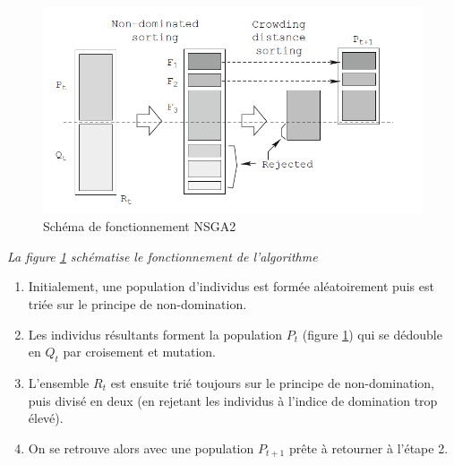 \documentclass[12pt]{report}
\begin{document}
      \begin{figure}[h]
        \centering
        \includegraphics[width=12cm]{img/sch_nsga2.png}
        \caption{Schéma de fonctionnement NSGA2}
        \label{sch_nsga2}
      \end{figure}

      \emph{La figure \ref{sch_nsga2} schématise le fonctionnement de l'algorithme}
      \begin{enumerate}
        \item Initialement, une population d'individus est formée aléatoirement puis est triée sur le principe de non-domination.
        \item Les individus résultants forment la population $P_{t}$ (figure \ref{sch_nsga2}) qui se dédouble en $Q_{t}$ par croisement et mutation.
        \item L'ensemble $R_{t}$ est ensuite trié toujours sur le principe de non-domination, puis divisé en deux (en rejetant les individus à l'indice de domination trop élevé).
        \item On se retrouve alors avec une population $P_{t+1}$ prête à retourner à l'étape 2.
      \end{enumerate}
\end{document}
